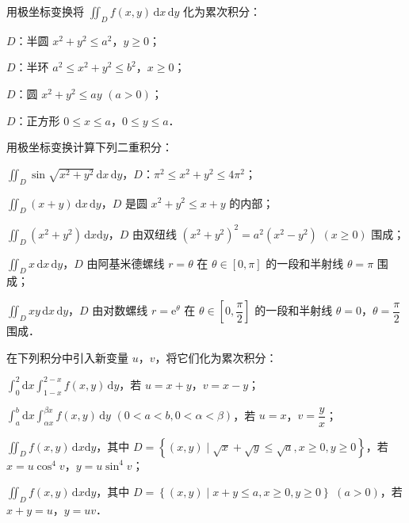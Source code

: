 \begin{xiti}
\item 用极坐标变换将 $\displaystyle\iint_{D}f(x,y)\,\mathrm{d}x\,\mathrm{d}y$ 化为累次积分：
\begin{ziti}
\item $D$：半圆 $x^{2}+y^{2}\leqslant a^{2}$，$y\geqslant 0$；
\item $D$：半环 $a^{2}\leqslant x^{2}+y^{2}\leqslant b^{2}$，$x\geqslant 0$；
\item $D$：圆 $x^{2}+y^{2}\leqslant ay$ $(a>0)$；
\item $D$：正方形 $0\leqslant x\leqslant a$，$0\leqslant y\leqslant a$．
\end{ziti}
\item 用极坐标变换计算下列二重积分：
\begin{ziti}
\item $\displaystyle\iint_{D}\sin\sqrt{x^{2}+y^{2}}\,\mathrm{d}x\,\mathrm{d}y$，$D$：$\pi^{2}\leqslant x^{2}+y^{2}\leqslant 4\pi^{2}$；
\item $\displaystyle\iint_{D}(x+y)\,\mathrm{d}x\,\mathrm{d}y$，$D$ 是圆 $x^{2}+y^{2}\leqslant x+y$ 的内部；
\item $\displaystyle\iint_{D}(x^{2}+y^{2})\,\mathrm{d}x\mathrm{d}y$，$D$ 由双纽线 $(x^{2}+y^{2})^{2}=a^{2}(x^{2}-y^{2})$ $(x\geqslant 0)$ 围成；
\item $\displaystyle\iint_{D}x\,\mathrm{d}x\,\mathrm{d}y$，$D$ 由阿基米德螺线 $r=\theta$ 在 $\theta\in[0,\pi]$ 的一段和半射线 $\theta=\pi$ 围成；
\item $\displaystyle\iint_{D}xy\,\mathrm{d}x\,\mathrm{d}y$，$D$ 由对数螺线 $r=\mathrm{e}^{\theta}$ 在 $\theta\in\left[0,\dfrac{\pi}{2}\right]$ 的一段和半射线 $\theta=0$，$\theta=\dfrac{\pi}{2}$ 围成．
\end{ziti}
\item 在下列积分中引入新变量 $u$，$v$，将它们化为累次积分：
\begin{ziti}
\item $\displaystyle\int_{0}^{2}\mathrm{d}x\int_{1-x}^{2-x}f(x,y)\,\mathrm{d}y$，若 $u=x+y$，$v=x-y$；
\item $\displaystyle\int_{a}^{b}\mathrm{d}x\int_{\alpha x}^{\beta x}f(x,y)\,\mathrm{d}y$ $\left(0<a<b,0<\alpha<\beta\right)$，若 $u=x$，$v=\dfrac{y}{x}$；
\item $\displaystyle\iint_{D}f(x,y)\,\mathrm{d}x\mathrm{d}y$，其中 $D=\left\{(x,y)\mid\sqrt{x}+\sqrt{y}\leqslant\sqrt{a},x\geqslant 0,y\geqslant 0\right\}$，若 $x=u\cos^{4}v$，$y=u\sin^{4}v$；
\item $\displaystyle\iint_{D}f(x,y)\,\mathrm{d}x\mathrm{d}y$，其中 $D=\left\{(x,y)\mid x+y\leqslant a,x\geqslant 0,y\geqslant 0\right\}$ $(a>0)$，若 $x+y=u$，$y=uv$．

\end{ziti}
\end{xiti}
